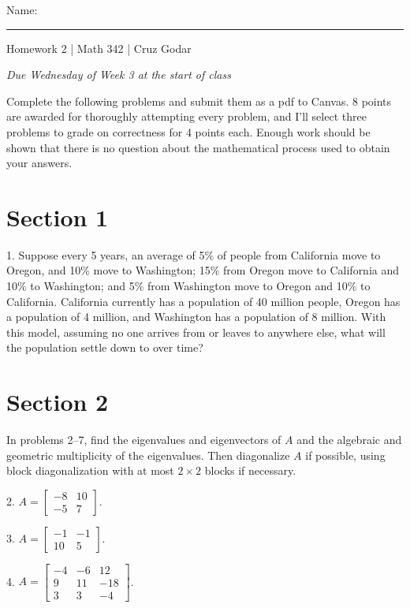 \documentclass{article}
\begin{document}
\Large Name: \rule{2in}{0.15mm} \hfill Homework 2 | Math 342 | Cruz Godar \vspace{4pt} \normalsize

\textit{Due Wednesday of Week 3 at the start of class}

Complete the following problems and submit them as a pdf to Canvas. 8 points are awarded for thoroughly attempting every problem, and I'll select three problems to grade on correctness for 4 points each. Enough work should be shown that there is no question about the mathematical process used to obtain your answers.

\section{Section 1}

1. Suppose every 5 years, an average of 5\% of people from California move to Oregon, and 10\% move to Washington; 15\% from Oregon move to California and 10\% to Washington; and 5\% from Washington move to Oregon and 10\% to California. California currently has a population of 40 million people, Oregon has a population of 4 million, and Washington has a population of 8 million. With this model, assuming no one arrives from or leaves to anywhere else, what will the population settle down to over time?

\section{Section 2}

In problems 2--7, find the eigenvalues and eigenvectors of $A$ and the algebraic and geometric multiplicity of the eigenvalues. Then diagonalize $A$ if possible, using block diagonalization with at most $2 \times 2$ blocks if necessary.

2. $A = \left[\begin{array}{cc} -8& 10 \\ -5& 7 \end{array}\right]$.

3. $A = \left[\begin{array}{cc} -1& -1 \\ 10& 5 \end{array}\right]$.

4. $A = \left[\begin{array}{ccc} -4& -6& 12 \\ 9& 11& -18 \\ 3& 3& -4 \end{array}\right]$.
\end{document}
